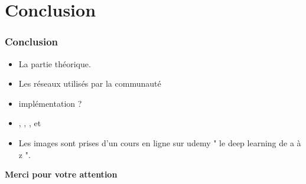 \documentclass[11pt]{beamer}
\begin{document}
\section{Conclusion}
\begin{frame}
\frametitle{Conclusion}
\begin{itemize}
	\item La partie théorique.
	\item Les réseaux utilisés par la communauté
	\item implémentation ?
	\item \cite{fukushima1980neocognitron},
\cite{lecun1995convolutional},
\cite{lecun1998gradient},
\cite{scherer2010evaluation} et 
\cite{wu2017convolutional}
	\item Les images sont prises d'un cours en ligne sur udemy " le deep learning de a à z ".
\end{itemize}
\end{frame}

\begin{frame}

 
\end{frame}


\begin{frame}
\begin{center}
\textbf{\Large{Merci pour votre attention}}
\end{center}
\end{frame}
\end{document}
